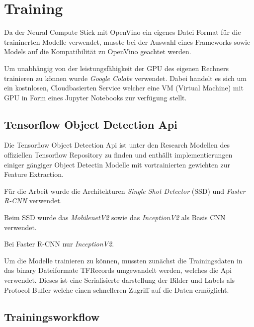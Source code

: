\section{Training}

Da der Neural Compute Stick mit OpenVino ein eigenes Datei Format 
für die traininerten Modelle verwendet, musste bei der Auswahl
eines Frameworks sowie Models auf die Kompatibilität zu OpenVino 
geachtet werden. 

Um unabhängig von der leistungsfähigkeit der GPU des eigenen 
Rechners trainieren zu können wurde \textit{Google Colabe} verwendet.
Dabei handelt es sich um ein kostnlosen, Cloudbasierten Service 
welcher eine VM (Virtual Machine) mit GPU in Form eines Jupyter Notebooks zur 
verfügung stellt.

\subsection{Tensorflow Object Detection Api}

Die Tensorflow Object Detection Api ist unter den Research Modellen
\cite{tfobjdet} des offiziellen Tensorflow Repository zu
finden und enthällt implementierungen einiger gängiger Object Detectin
Modelle mit vortrainierten gewichten zur Feature Extraction.


Für die Arbeit wurde die Architekturen \textit{Single Shot Detector}
(SSD) und \textit{Faster R-CNN} verwendet.

Beim SSD wurde das \textit{MobilenetV2} sowie das \textit{InceptionV2} 
als Basis CNN verwendet.

Bei Faster R-CNN nur \textit{InceptionV2}.


Um die Modelle trainieren zu können, mussten zunächst die 
Trainingsdaten in das binary Dateiformate TFRecords umgewandelt 
werden, welches die Api verwendet. Dieses ist eine Serialisierte 
darstellung der Bilder und Labels als Protocol Buffer welche einen 
schnelleren Zugriff auf die Daten ermöglicht.



\subsection{Trainingsworkflow}

